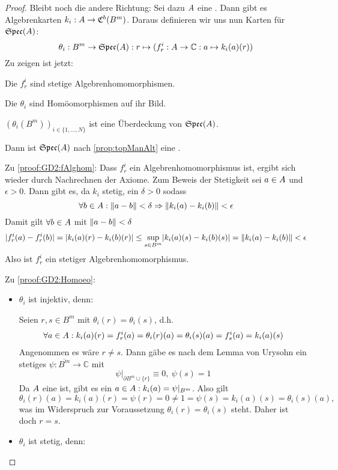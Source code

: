 \begin{proof}
Bleibt noch die andere Richtung: Sei dazu $A$ eine \CAlgMan{}. Dann gibt es Algebrenkarten $k_i: A \to \mathfrak{C}^b(B^m)$. Daraus  definieren wir uns nun Karten für $\mathfrak{Spec}(A)$:
	\[\theta_i: B^m \to \mathfrak{Spec}(A): r \mapsto (f_r^i: A \to \mathbb{C}: a \mapsto k_i(a)(r)) \]
Zu zeigen ist jetzt:
\begin{proofenum}
	\setcounter{proofenumi}{\value{temp}}
	\item \label{proof:GD2:fAlghom}
		Die $f_r^i$ sind stetige Algebrenhomomorphismen.
	\item \label{proof:GD2:Homoeo}
		Die $\theta_i$ sind Homöomorphismen auf ihr Bild.
	\item \label{proof:GD2:Ueberdeckung}
		$(\theta_i(B^m))_{i\in\{1,\dots,N\}}$ ist eine Überdeckung von $\mathfrak{Spec}(A)$.
\end{proofenum}
Dann ist $\mathfrak{Spec}(A)$ nach \cref{prop:topManAlt} eine \komTopMan.

Zu \ref{proof:GD2:fAlghom}: Dass $f_r^i$ ein Algebrenhomomorphismus ist, ergibt sich wieder durch Nachrechnen der Axiome. Zum Beweis der Stetigkeit sei $a \in A$ und $\epsilon > 0$. Dann gibt es, da $k_i$ stetig, ein $\delta>0$ sodass 
\[\forall b \in A: \left\lVert a-b\right\rVert < \delta \Rightarrow \left\lVert k_i(a)-k_i(b)\right\rVert < \epsilon\]
Damit gilt $\forall b \in A$ mit $\left\lVert a-b\right\rVert < \delta$
\[ |f_r^i(a) - f_r^i(b)| = |k_i(a)(r)-k_i(b)(r)| \leq \underset{s \in B^m}{\sup} |k_i(a)(s)-k_i(b)(s)| = \left\lVert k_i(a)-k_i(b)\right\rVert < \epsilon\]
Also ist $f_r^i$ ein stetiger Algebrenhomomorphismus.

Zu \ref{proof:GD2:Homoeo}: \begin{itemize}
	\item $\theta_i$ ist injektiv, denn:
	
	Seien $r, s \in B^m$ mit $\theta_i(r) = \theta_i(s)$, d.h. 
	\begin{align*}
		\forall a \in A: k_i(a)(r) = f_r^i(a) = \theta_i(r)(a) = \theta_i(s)(a) = f_s^i(a)  = k_i(a)(s)
	\end{align*}
	Angenommen es wäre $r \neq s$. Dann gäbe es nach dem Lemma von Urysohn ein stetiges $\psi: \overline{B^m} \to \mathbb{C}$ mit
	\[\psi|_{\partial B^m \cup \{r\}} \equiv 0, ~\psi(s) = 1\]
	Da $A$ eine \CAlgMan{} ist, gibt es ein $a \in A: k_i(a) = \psi|_{B^m}$. Also gilt 
	\[\theta_i(r)(a) = k_i(a)(r) = \psi(r) = 0 \neq 1 = \psi(s) = k_i(a)(s) = \theta_i(s)(a),\]
	was im Widerspruch zur Voraussetzung $\theta_i(r) = \theta_i(s)$ steht. Daher ist doch $r = s$.
	
	\item $\theta_i$ ist stetig, denn:
	

\end{itemize}
\end{proof}
